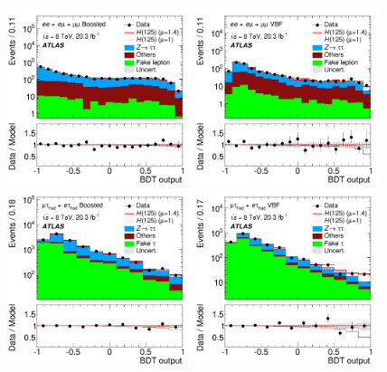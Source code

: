 \clearpage
\begin{figure}[tp]
  \centering
  \includegraphics[width=0.48\textwidth]{figures/HIGG-2013-32/fig_08b}
  \includegraphics[width=0.48\textwidth]{figures/HIGG-2013-32/fig_08a}
  \includegraphics[width=0.48\textwidth]{figures/HIGG-2013-32/fig_08d}
  \includegraphics[width=0.48\textwidth]{figures/HIGG-2013-32/fig_08c}

\end{figure}
